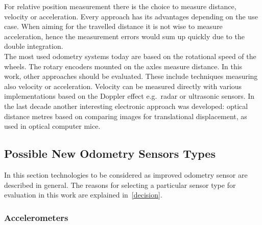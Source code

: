 \documentclass[12pt,a4paper]{article}
\begin{document}
For relative position measurement there is the choice to measure distance, velocity or acceleration.
Every approach has its advantages depending on the use case.
When aiming for the travelled distance it is not wise to measure acceleration, hence the measurement errors would sum up quickly due to the double integration.\\
The most used odometry systems today are based on the rotational speed of the wheels.
The rotary encoders mounted on the axles measure distance.
In this work, other approaches should be evaluated. 
These include techniques measuring also velocity or acceleration.
Velocity can be measured directly with various implementations based on the Doppler effect e.g.\ radar or ultrasonic sensors.
In the last decade another interesting electronic approach was developed: optical distance metres based on comparing images for translational displacement, as used in optical computer mice.

\subsection{Possible New Odometry Sensors Types}
\label{ssec:ntypes}

In this section technologies to be considered as improved odometry sensor are described in general.
The reasons for selecting a particular sensor type for evaluation in this work are explained in~\autoref{decision}.


\subsubsection{Accelerometers}
\end{document}
